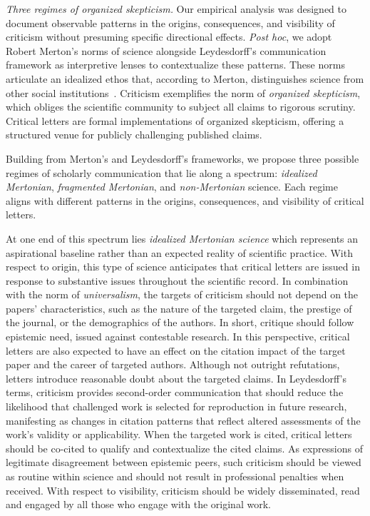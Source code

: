 \documentclass[12pt]{article} %
\begin{document}
\textit{Three regimes of organized skepticism.}
Our empirical analysis was designed to document observable patterns in the origins, consequences, and visibility of criticism without presuming specific directional effects. 
\textit{Post hoc}, we adopt Robert Merton's norms of science alongside Leydesdorff's communication framework as interpretive lenses to contextualize these patterns.
These norms articulate an idealized ethos that, according to Merton, distinguishes science from other social institutions~\cite{merton1942science}.
Criticism exemplifies the norm of \textit{organized skepticism}, which obliges the scientific community to subject all claims to rigorous scrutiny.
Critical letters are formal implementations of organized skepticism, offering a structured venue for publicly challenging published claims.

Building from Merton's and Leydesdorff's frameworks, we propose three possible regimes of scholarly communication that lie along a spectrum: \textit{idealized Mertonian}, \textit{fragmented Mertonian}, and \textit{non-Mertonian} science.
Each regime aligns with different patterns in the origins, consequences, and visibility of critical letters.

At one end of this spectrum lies \textit{idealized Mertonian science} which represents an aspirational baseline rather than an expected reality of scientific practice. 
With respect to origin, this type of science anticipates that critical letters are issued in response to substantive issues throughout the scientific record.
In combination with the norm of \textit{universalism}, the targets of criticism should not depend on the papers' characteristics, such as the nature of the targeted claim, the prestige of the journal, or the demographics of the authors. 
In short, critique should follow epistemic need, issued against contestable research. 
In this perspective, critical letters are also expected to have an effect on the citation impact of the target paper and the career of targeted authors.
Although not outright refutations, letters introduce reasonable doubt about the targeted claims. 
In Leydesdorff's terms, criticism provides second-order communication that should reduce the likelihood that challenged work is selected for reproduction in future research, manifesting as changes in citation patterns that reflect altered assessments of the work's validity or applicability.
When the targeted work is cited, critical letters should be co-cited to qualify and contextualize the cited claims.
As expressions of legitimate disagreement between epistemic peers, such criticism should be viewed as routine within science and should not result in professional penalties when received.
With respect to visibility, criticism should be widely disseminated, read and engaged by all those who engage with the original work. 
\end{document}

